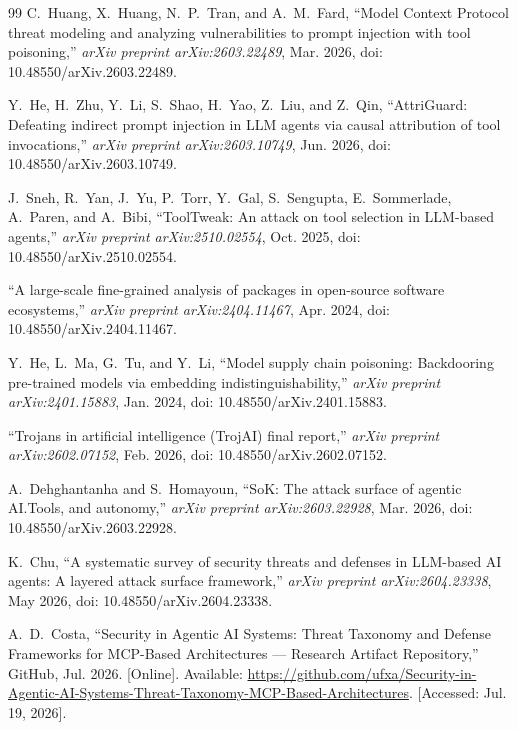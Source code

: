 \documentclass[12pt,twocolumn,journal]{IEEEtran}
\begin{document}
\begin{thebibliography}{99}
C.~Huang, X.~Huang, N.~P.~Tran, and A.~M.~Fard, ``Model Context Protocol threat modeling and analyzing vulnerabilities to prompt injection with tool poisoning,'' \emph{arXiv preprint arXiv:2603.22489}, Mar. 2026, doi: 10.48550/arXiv.2603.22489.

Y.~He, H.~Zhu, Y.~Li, S.~Shao, H.~Yao, Z.~Liu, and Z.~Qin, ``AttriGuard: Defeating indirect prompt injection in LLM agents via causal attribution of tool invocations,'' \emph{arXiv preprint arXiv:2603.10749}, Jun. 2026, doi: 10.48550/arXiv.2603.10749.

J.~Sneh, R.~Yan, J.~Yu, P.~Torr, Y.~Gal, S.~Sengupta, E.~Sommerlade, A.~Paren, and A.~Bibi, ``ToolTweak: An attack on tool selection in LLM-based agents,'' \emph{arXiv preprint arXiv:2510.02554}, Oct. 2025, doi: 10.48550/arXiv.2510.02554.

``A large-scale fine-grained analysis of packages in open-source software ecosystems,'' \emph{arXiv preprint arXiv:2404.11467}, Apr. 2024, doi: 10.48550/arXiv.2404.11467.

Y.~He, L.~Ma, G.~Tu, and Y.~Li, ``Model supply chain poisoning: Backdooring pre-trained models via embedding indistinguishability,'' \emph{arXiv preprint arXiv:2401.15883}, Jan. 2024, doi: 10.48550/arXiv.2401.15883.

``Trojans in artificial intelligence (TrojAI) final report,'' \emph{arXiv preprint arXiv:2602.07152}, Feb. 2026, doi: 10.48550/arXiv.2602.07152.

A.~Dehghantanha and S.~Homayoun, ``SoK: The attack surface of agentic AI.Tools, and autonomy,'' \emph{arXiv preprint arXiv:2603.22928}, Mar. 2026, doi: 10.48550/arXiv.2603.22928.

K.~Chu, ``A systematic survey of security threats and defenses in LLM-based AI agents: A layered attack surface framework,'' \emph{arXiv preprint arXiv:2604.23338}, May 2026, doi: 10.48550/arXiv.2604.23338.

A.~D.~Costa, ``Security in Agentic AI Systems: Threat Taxonomy and Defense Frameworks for MCP-Based Architectures --- Research Artifact Repository,'' GitHub, Jul. 2026. [Online]. Available: \url{https://github.com/ufxa/Security-in-Agentic-AI-Systems-Threat-Taxonomy-MCP-Based-Architectures}. [Accessed: Jul. 19, 2026].

\end{thebibliography}

\appendix


\end{document}
